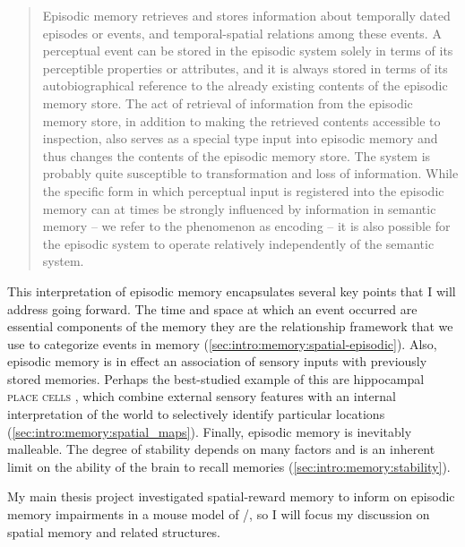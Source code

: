 \begin{quote}
Episodic memory retrieves and stores information about temporally dated episodes or events, and temporal-spatial relations among these events. A perceptual event can be stored in the episodic system solely in terms of its perceptible properties or attributes, and it is always stored in terms of its autobiographical reference to the already existing contents of the episodic memory store. The act of retrieval of information from the episodic memory store, in addition to making the retrieved contents accessible to inspection, also serves as a special type input into episodic memory and thus changes the contents of the episodic memory store. The system is probably quite susceptible to transformation and loss of information. While the specific form in which perceptual input is registered into the episodic memory can at times be strongly influenced by information in semantic memory -- we refer to the phenomenon as encoding -- it is also possible for the episodic system to operate relatively independently of the semantic system.
\end{quote}

This interpretation of episodic memory encapsulates several key points that I will address going forward.
The time and space at which an event occurred are essential components of the memory they are the relationship framework that we use to categorize events in memory (\autoref{sec:intro:memory:spatial-episodic}).
Also, episodic memory is in effect an association of sensory inputs with previously stored memories.
Perhaps the best-studied example of this are hippocampal \textsc{place cells} \citep{O'Keefe1971}, which combine external sensory features with an internal interpretation of the world to selectively identify particular locations (\autoref{sec:intro:memory:spatial_maps}).
Finally, episodic memory is inevitably malleable.
The degree of stability depends on many factors and is an inherent limit on the ability of the brain to recall memories (\autoref{sec:intro:memory:stability}).

My main thesis project investigated spatial-reward memory to inform on episodic memory impairments in a mouse model of \scz/, so I will focus my discussion on spatial memory and related structures.


